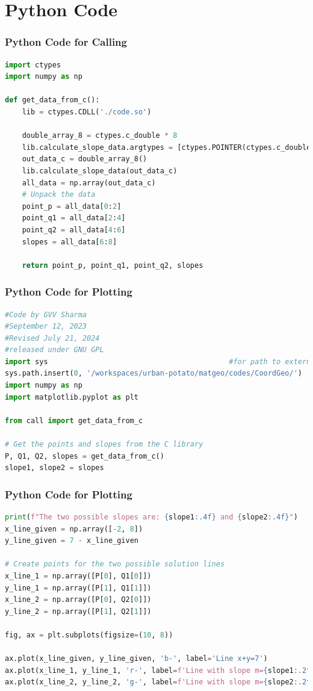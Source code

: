 \documentclass{beamer}
\theoremstyle{remark}
\numberwithin{equation}{section}
\begin{document}
\section{Python Code}
\begin{frame}[fragile]
\frametitle{Python Code for Calling}
\begin{lstlisting}[language=Python]
import ctypes
import numpy as np

def get_data_from_c():
    lib = ctypes.CDLL('./code.so')
    
    double_array_8 = ctypes.c_double * 8
    lib.calculate_slope_data.argtypes = [ctypes.POINTER(ctypes.c_double)]
    out_data_c = double_array_8()
    lib.calculate_slope_data(out_data_c)
    all_data = np.array(out_data_c)
    # Unpack the data
    point_p = all_data[0:2]
    point_q1 = all_data[2:4]
    point_q2 = all_data[4:6]
    slopes = all_data[6:8]
    
    return point_p, point_q1, point_q2, slopes
\end{lstlisting}
\end{frame}
\begin{frame}[fragile]
\frametitle{Python Code for Plotting}
\begin{lstlisting}[language=Python]
#Code by GVV Sharma
#September 12, 2023
#Revised July 21, 2024
#released under GNU GPL
import sys                                          #for path to external scripts
sys.path.insert(0, '/workspaces/urban-potato/matgeo/codes/CoordGeo/') 
import numpy as np
import matplotlib.pyplot as plt

from call import get_data_from_c

# Get the points and slopes from the C library
P, Q1, Q2, slopes = get_data_from_c()
slope1, slope2 = slopes
\end{lstlisting}
\end{frame}

\begin{frame}[fragile]
\frametitle{Python Code for Plotting}
\begin{lstlisting}[language=Python]
print(f"The two possible slopes are: {slope1:.4f} and {slope2:.4f}")
x_line_given = np.array([-2, 8])
y_line_given = 7 - x_line_given

# Create points for the two possible solution lines
x_line_1 = np.array([P[0], Q1[0]])
y_line_1 = np.array([P[1], Q1[1]])
x_line_2 = np.array([P[0], Q2[0]])
y_line_2 = np.array([P[1], Q2[1]])

fig, ax = plt.subplots(figsize=(10, 8))

ax.plot(x_line_given, y_line_given, 'b-', label='Line x+y=7')
ax.plot(x_line_1, y_line_1, 'r-', label=f'Line with slope m={slope1:.2f}')
ax.plot(x_line_2, y_line_2, 'g-', label=f'Line with slope m={slope2:.2f}')
\end{lstlisting}
\end{frame}
\end{document}
